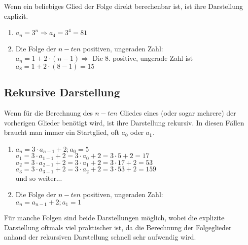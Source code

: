 \documentclass[../MAIN/main.tex]{subfiles}
\begin{document}
\begin{Definition}
Wenn ein beliebiges Glied der Folge direkt berechenbar ist, ist ihre Darstellung explizit.
\end{Definition}

\begin{Beispiel}
	\begin{enumerate}
		\item $a_{n}=3^n \Rightarrow a_{4}=3^4=81$
		\item Die Folge der $n-ten$ positiven, ungeraden Zahl:\\
		$a_{n}=1+2\cdot(n-1) \Rightarrow$ Die 8. positive, ungerade Zahl ist $ a_{8}=1+2\cdot(8-1)=15$
	\end{enumerate}
\end{Beispiel}


	\subsection{Rekursive Darstellung}

\begin{Definition}
Wenn für die Berechnung des $n-ten$ Gliedes eines (oder sogar mehrere) der vorherigen Glieder benötigt wird, ist ihre Darstellung rekursiv.
In diesen Fällen braucht man immer ein Startglied, oft $a_{0}$ oder $ a_{1}$.
\end{Definition}

\begin{Beispiel}
\begin{enumerate}
\item  $a_{n}=3\cdot a_{n-1}+2;a_{0}=5$\\
\indent$a_{1}=3\cdot a_{1-1}+2=3\cdot a_{0}+2=3\cdot5+2=17$\\
\indent$a_{2}=3\cdot a_{2-1}+2=3\cdot a_{1}+2=3\cdot17+2=53$\\
\indent$a_{3}=3\cdot a_{3-1}+2=3\cdot a_{2}+2=3\cdot53+2=159$\\
\indent und so weiter...
\item Die Folge der $n-ten$ positiven, ungeraden Zahl:\\
$a_{n}=a_{n-1}+2;a_{1}=1$
\end{enumerate}
\end{Beispiel}

\begin{Bemerkung}
Für manche Folgen sind beide Darstellungen möglich, wobei die explizite Darstellung oftmals viel praktischer ist, da die Berechnung der Folgeglieder anhand der rekursiven Darstellung schnell sehr aufwendig wird.
\end{Bemerkung}
\end{document}
